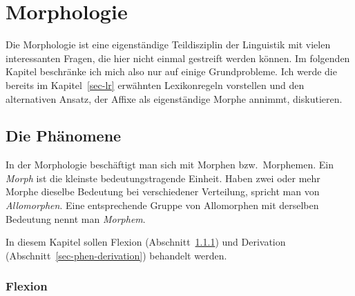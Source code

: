 


\chapter{Morphologie}
\label{Kapitel-morphologie}
\label{Kapitel-Morphologie}

Die Morphologie ist eine eigenständige Teildisziplin der Linguistik mit vielen interessanten
Fragen, die hier nicht einmal gestreift werden können. Im folgenden Kapitel beschränke ich
mich also nur auf einige Grundprobleme. Ich werde die bereits im Kapitel~\ref{sec-lr}
erwähnten Lexikonregeln vorstellen und den alternativen Ansatz, der Affixe als eigenständige
Morphe annimmt, diskutieren.


\section{Die Phänomene}

In der Morphologie beschäftigt man sich mit Morphen bzw.\ Morphemen. Ein \emph{Morph} ist
die kleinste bedeutungstragende Einheit. Haben zwei oder mehr Morphe dieselbe Bedeutung
bei verschiedener Verteilung, spricht man von \emph{Allomorphen}. Eine entsprechende Gruppe
von Allomorphen mit derselben Bedeutung nennt man \emph{Morphem}. 

In diesem Kapitel sollen Flexion (Abschnitt~\ref{sec-phen-flexion})
und Derivation (Abschnitt~\ref{sec-phen-derivation}) behandelt werden.

\subsection{Flexion}
\label{sec-phen-flexion}


